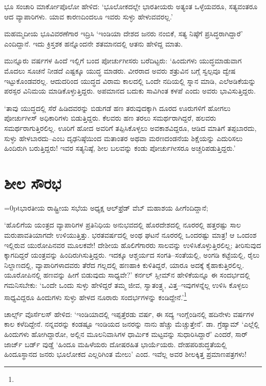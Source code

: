 ಭೂ ಸಂಚಾರಿ ಮಾರ್ಕೋಪೊಲೋ ಹೇಳಿದ: ‘ಭೂಲೋಕದಲ್ಲೇ ಭಾರತೀಯರು ಅತ್ಯಂತ ಒಳ್ಳೆಯವರೂ, ಸತ್ಯವಂತರೂ ಆದ ವ್ಯಾಪಾರಿಗಳು. ಯಾವ ಕಾರಣದಿಂದಲೂ ಇವರು ಸುಳ್ಳು ಹೇಳುವವರಲ್ಲ.’

ಮಹಮ್ಮದೀಯ ಭೂವಿವರಣೆಗಾರ ಇದ್ರಿಸಿ ‘ಇಂಡಿಯಾ ದೇಶದ ಜನರು ನಂಬಿಕೆ, ಸತ್ಯ ನಿಷ್ಠೆಗೆ ಪ್ರಸಿದ್ಧರಾಗಿದ್ದಾರೆ’ ಎಂದಿದ್ದಾನೆ. ಇದು ಕ್ರಿಸ್ತಶಕ ಹನ್ನೊಂದನೇ ಶತಮಾನದಲ್ಲಿ ಆತನು ಹೇಳಿದ್ದ ಮಾತು.

ಮುನ್ನೂರು ವರ್ಷಗಳ ಹಿಂದೆ ಇಲ್ಲಿಗೆ ಬಂದ ಪೋರ್ಚುಗೀಸರು ಬರೆದಿಟ್ಟರು: ‘ಹಿಂದುಗಳು ಯುದ್ಧಮಾಡುವಾಗ ಮೊದಲು ಸೂಚನೆ ನೀಡದೆ ಎಷ್ಟಕ್ಕೂ ಯುದ್ಧ ಮಾಡರು. ವೀರರಾದ ಅವರು ಶತ್ರುವಿನ ಬಗ್ಗೆ ಸ್ವಲ್ಪವೂ ದ್ವೇಷ ಇಟ್ಟುಕೊಂಡವರಲ್ಲ. ಆದುದರಿಂದ ಯುದ್ಧದ ವಿರಾಮ ಕಾಲದಲ್ಲಿ ಒಂದೇ ನದಿಯಲ್ಲಿ ಸ್ನಾನ ಮಾಡಿ, ಎಲೆಅಡಿಕೆಯನ್ನು ಪರಸ್ಪರ ವಿನಿಮಯ ಮಾಡಿಕೊಳ್ಳುತ್ತಿದ್ದರು. ಅಪಮಾನದ ಬದುಕು ಸಾವಿಗಿಂತ ಕಳಪೆ ಎಂದು ಅವರು ಭಾವಿಸುತ್ತಿದ್ದರು.

‘ತಾವು ಯುದ್ಧದಲ್ಲಿ ಸೆರೆ ಹಿಡಿದವರನ್ನು ಬಿಡುಗಡೆ ಹಣ ತರುವುದಕ್ಕಾಗಿ ದೂರದ ಊರುಗಳಿಗೆ ಹೋಗಲು ಪೋರ್ಚುಗೀಸ್ ಅಧಿಕಾರಿಗಳು ಬಿಡುತ್ತಿದ್ದರು. ಕೆಲವರು ಹಣ ತರಲು ಸಮರ್ಥರಾಗಿದ್ದರೆ, ಹಲವರು ಸಮರ್ಥರಾಗುತ್ತಿರಲಿಲ್ಲ. ಊರಿಗೆ ಹೋದ ಅವರಿಗೆ ತಪ್ಪಿಸಿಕೊಳ್ಳಲು ಅವಕಾಶವಿದ್ದರೂ, ಆಡಿದ ಮಾತಿಗೆ ತಪ್ಪಬಾರದು, ಸುಳ್ಳು ಹೇಳಬಾರದು–ಎಂಬ ದೃಢನಿಷ್ಠೆಯಿಂದ ಮತಾಂತರ ಅಥವಾ ಮರಣದಂಡನೆಯ ಶಿಕ್ಷೆಯನ್ನು ಎದುರಿಸಲು ಹಿಂದಿರುಗಿ ಬರುತ್ತಿದ್ದರು! ಇವರ ಸತ್ಯನಿಷ್ಠೆ, ಶೀಲ ಬಲವನ್ನು ಕಂಡು ಪೋರ್ಚುಗೀಸರೂ ಅಚ್ಚರಿಪಡುತ್ತಿದ್ದರು.’


\section*{ಶೀಲ ಸೌರಭ}


{\parfillskip=0ptಭಾರತೀಯ ರಾಷ್ಟ್ರೀಯ ಸಭೆಯ ಅಧ್ಯಕ್ಷ ಆಲ್​ಫ್ರೆಡ್ ವೆಬ್ ಮಹಾಶಯ ಹೀಗೆಂದಿದ್ದಾನೆ;\par}\newpage\noindent ‘ಹೊಲಿಗೆಯ ಯಂತ್ರದ ವ್ಯಾಪಾರಿಗಳ ಪ್ರತಿನಿಧಿಯ ಅನುಭವದಲ್ಲಿ ಹೊರದೇಶದಲ್ಲಿ ನೂರರಲ್ಲಿ ಹತ್ತರಷ್ಟು ಸಾಲ ಮರುಪಾವತಿಯಾಗದೇ ಉಳಿಯುತ್ತಿತ್ತು. ಭರತವರ್ಷದಲ್ಲಿ ಅಂಥ ಘಟನೆ ನೂರರಲ್ಲಿ ಒಂದರಷ್ಟು ಮಾತ್ರ! ಆ ಒಂದಂಶ ಇಲ್ಲಿರುವ ಯುರೋಪಿನವರ ಮೂಲಕವೇ! ದೇಶೀಯ ಹೊಲಿಗೆಗಾರರು ಸಾಲವನ್ನು ಉಳಿಸಿಕೊಳ್ಳುತ್ತಿರಲಿಲ್ಲ; ತೀರಿಸುವುದ ಕ್ಕಾಗದಿದ್ದರೆ ಯಂತ್ರವನ್ನು ಹಿಂದಿರುಗಿಸುತ್ತಿದ್ದರು. ಇದಕ್ಕೂ ಆಶ್ಚರ್ಯದ ಸಂಗತಿ–ಸಂತೆಯಲ್ಲಿ, ಅಂಗಡಿ ಕಟ್ಟೆಯಲ್ಲಿ, ರೈಲು ನಿಲ್ದಾಣದಲ್ಲಿ, ವ್ಯಾಪಾರಿಗಳಾದವರು ತೆರೆದ ಗಲ್ಲದಲ್ಲಿ ಹಣಹಾಕಿ ಕುಳಿತಿದ್ದರೆ, ಯಾರೂ ಅದಕ್ಕೆ ಕೈಹಾಕುತ್ತಿರಲಿಲ್ಲ. ಯೂರೋಪಿನಲ್ಲಿ ಹಣವನ್ನು ಹೀಗೆ ಬಿಡುವುದು ಸಾಧ್ಯವೇ?’ ಕರ್ನಲ್ ಸ್ಲೀಮ್​ನ ಹೇಳಿಕೆಯನ್ನೂ ಈ ಸಂದರ್ಭದಲ್ಲಿ ಗಮನಿಸಬೇಕು: ‘ಒಂದೇ ಒಂದು ಸುಳ್ಳು ಹೇಳಿದ್ದರೆ ತಮ್ಮ ಜೀವ, ಸ್ವಾತಂತ್ರ್ಯ, ವಿತ್ತ–ಇವುಗಳನ್ನೆಲ್ಲ ಉಳಿಸಿ ಕೊಳ್ಳಲು ಸಾಧ್ಯವಿದ್ದರೂ ಹಿಂದುಗಳು ಸುಳ್ಳು ಹೇಳದ ನೂರಾರು ಸಂದರ್ಭಗಳನ್ನು ಕಂಡಿದ್ದೇನೆ.’\footnote{\hfill{}}

ಚಾರ್ಲ್ಸ್ ವೊರ್ಸೆಲಸ್ ಹೇಳಿದ: ‘ಇಂಡಿಯಾದಲ್ಲಿ ಇಪ್ಪತ್ತೆರಡು ವರ್ಷ, ಈ ಸದ್ಯ ಇಂಗ್ಲೆಂಡಿನಲ್ಲಿ ಹದಿನೇಳು ವರ್ಷಗಳ ಕಾಲ ಕಳೆದಿದ್ದೇನೆ. ನನ್ನವರನ್ನು ಕಂಡಷ್ಟೂ ಇಂಡಿಯದ ಜನರನ್ನು ನಾನು ಹೆಚ್ಚು ಮೆಚ್ಚುತ್ತೇನೆ’. ಡಾ. ಗ್ರೆಹ್ಯಾಮ್ ‘ಎಲ್ಲೆಲ್ಲಿ ಹಿಂದುಗಳು ಹೋಗಿದ್ದಾರೋ, ಅಲ್ಲಿನ ಮೂಲನಿವಾಸಿಗಳ ಧಾರ್ಮಿಕ ಮಟ್ಟವನ್ನು ಸುಧಾರಿಸಿದ್ದಾರೆ’ ಎಂದರೆ, ಸಾರ್ ಜಾರ್ಜ್ ಬರ್ಡ್ ವುಡ್ಡೆ ‘ಹಿಂದೂ ಮಹಿಳೆಯರು ದೋಷರಹಿತ ಭಾರ್ಯೆಯರು. ದೇಹಪರಿಶುದ್ಧತೆಯಲ್ಲಿ ಹಿಂದೂಸ್ಥಾನದ ಜನರು ಭೂಲೋಕದ ಎಲ್ಲರಿಗಿಂತ ಮೇಲು’ ಎಂದ. ಇವೆಲ್ಲ ಅವರ ಶೀಲಕ್ಕಿತ್ತ ಪ್ರಮಾಣಪತ್ರಗಳು!


